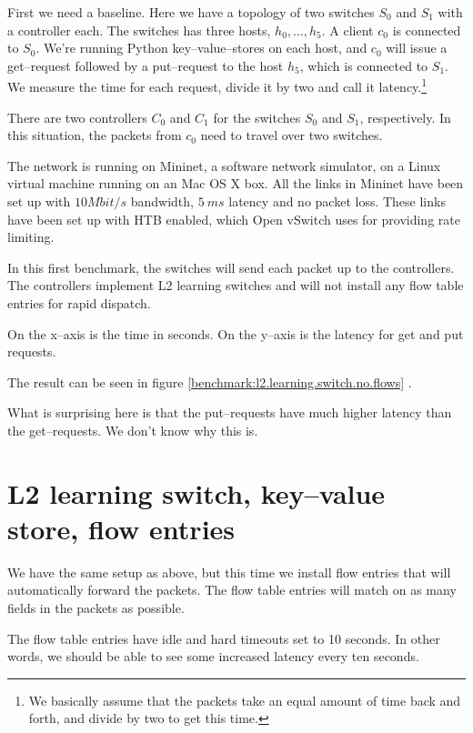 First we need a baseline.  Here we have a topology of two switches $S_0$ and
$S_1$ with a controller each.  The switches has three hosts, $h_0, \dots, h_5$.
A client $c_0$ is connected to $S_0$. We're running Python
key--value--stores on each host, and $c_0$ will issue a get--request
followed by a put--request to the host $h_5$, which is connected to $S_1$.
We measure the time for each request, divide it
by two and call it latency.\footnote{We basically assume that the packets
take an equal amount of time back and forth, and divide by two to get this
time.}

There are two controllers $C_0$ and $C_1$ for the switches $S_0$ and $S_1$,
respectively.  In this situation, the packets from $c_0$ need to travel
over two switches.

The network is running on Mininet, a software network simulator, on a Linux
virtual machine running on an Mac OS X box.  All the links in Mininet have
been set up with $10 Mbit/s$ bandwidth, $5~ms$ latency and no packet
loss.  These links have been set up with \ac{HTB}
\cite{devera2002hierarchical} enabled, which Open vSwitch
 uses for providing rate limiting.

In this first benchmark, the switches will send each packet up to the
controllers.  The controllers implement L2 learning switches and will not
install any flow table entries for rapid dispatch.

On the x--axis is the time in seconds.  On the y--axis is the latency for
get and put requests.

The result can be seen in figure \ref{benchmark:l2.learning.switch.no.flows} 
.

What is surprising here is that the put--requests have much higher latency
than the get--requests. We don't know why this is.

\section{L2 learning switch, key--value store, flow entries}

We have the same setup as above, but this time we install flow entries that
will automatically forward the packets.  The flow table entries will match
on as many fields in the packets as possible.

The flow table entries have idle and hard timeouts set to 10 seconds.
In other words, we should be able to see some increased latency every ten
seconds.

